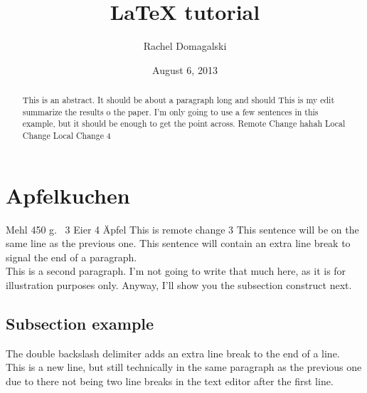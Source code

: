 \documentclass[11pt,letterpaper]{article}
\title{LaTeX tutorial}
\author{Rachel Domagalski}
\date{August 6, 2013}
\begin{document}
\maketitle %

\begin{abstract}
    This is an abstract. It should be about a paragraph long and should
    This is my edit
    summarize the results o  the paper. I'm only going to use a few sentences in
    this example, but it should be enough to get the point across.
    Remote Change hahah
    Local Change
    Local Change 4
    
    \end{abstract}

\section{Apfelkuchen}

Mehl 450 g.~\cite[S.~56ff]{CarlvonOssietzkyUniversitatOldenburg.2005}
3 Eier 
4 Äpfel
This is remote change 3
This sentence will be on the same line as the previous one.
This sentence will contain an extra line break to signal the end of a
paragraph.\\

This is a second paragraph. I'm not going to write that much here, as it is for
illustration purposes only. Anyway, I'll show you the subsection construct next.

\subsection{Subsection example}

The double backslash delimiter adds an extra line break to the end of a line.\\
This is a new line, but still technically in the same paragraph as the previous
one due to there not being two line breaks in the text editor after the first
line.
\end{document}
